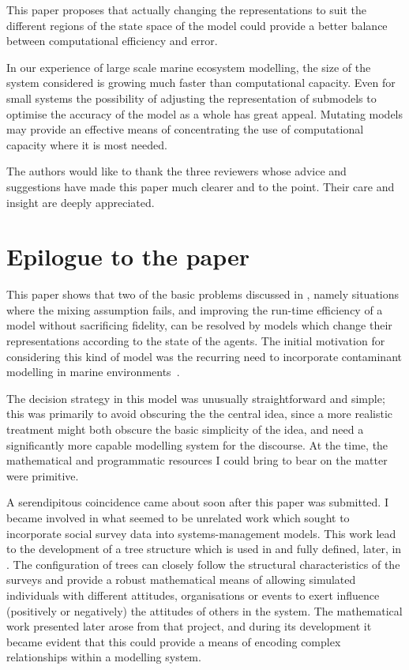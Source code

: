This paper proposes that actually changing the representations to suit the
different regions of the state space of the model could provide a better
balance between computational efficiency and error.

In our experience of large scale marine ecosystem modelling, the size of the
system considered is growing much faster than computational capacity. Even for
small systems the possibility of adjusting the representation of submodels to
optimise the accuracy of the model as a whole has great appeal. Mutating
models may provide an effective means of concentrating the use of
computational capacity where it is most needed.


The authors would like to thank the three reviewers whose advice and
suggestions have made this paper much clearer and to the point. Their care and
insight are deeply appreciated.
\pagebreak

\section{Epilogue to the paper}

This paper shows that two of the basic problems discussed in \Cone,
namely situations where the mixing assumption fails, and improving the
run-time efficiency of a model without sacrificing fidelity, can be
resolved by models which change their representations according to the
state of the agents.  The
initial motivation for considering this kind of model was the
recurring need to incorporate contaminant modelling in marine
environments~\cite{lyne1994pmez5, gray2006nws, grayningaloo}. 

The decision strategy in this model was unusually straightforward and
simple; this was primarily to avoid obscuring the the central idea,
since a more realistic treatment might both obscure the basic
simplicity of the idea, and need a significantly more capable
modelling system for the discourse.  At the time, the mathematical and
programmatic resources I could bring to bear on the matter were
primitive.

A serendipitous coincidence came about soon after this paper was
submitted. I became involved in what seemed to be unrelated work which
sought to incorporate social survey data into systems-management
models. This work lead to the development of a tree structure which is
used in \Cthree and fully defined, later, in
\Cfour. The configuration of trees can closely follow
the structural characteristics of the surveys and provide a robust
mathematical means of allowing simulated individuals with different
attitudes, organisations or events to exert influence (positively or
negatively) the attitudes of others in the system.  The mathematical
work presented later arose from that project, and during its
development it became evident that this could provide a means of
encoding complex relationships within a modelling system.







